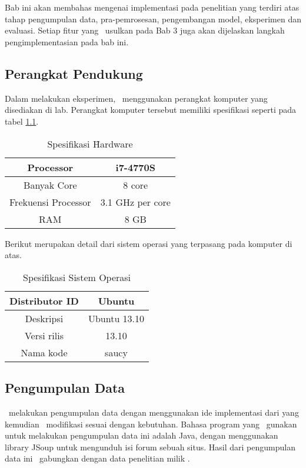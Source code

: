 \chapter{\babEmpat} \label{eksperimen}

Bab ini akan membahas mengenai implementasi pada penelitian yang terdiri atas tahap pengumpulan data, pra-pemrosesan, pengembangan model, eksperimen dan evaluasi. Setiap fitur yang \saya~usulkan pada Bab 3 juga akan dijelaskan langkah pengimplementasian pada bab ini.

\section{Perangkat Pendukung}
Dalam melakukan eksperimen, \saya~menggunakan perangkat komputer yang disediakan di lab. Perangkat komputer tersebut memiliki spesifikasi seperti pada tabel \ref{table:spesifikasi hardware}.

\begin{table}
	\centering
	\caption{Spesifikasi \f{Hardware}}
	\begin{tabular}{|c|c|}
		\hline
		Processor & i7-4770S \\ \hline
		Banyak Core & 8 core \\ \hline
		Frekuensi Processor & 3.1 GHz per core \\ \hline
		RAM & 8 GB \\ \hline
	\end{tabular}
	\label{table:spesifikasi hardware}
\end{table}

Berikut merupakan detail dari sistem operasi yang terpasang pada komputer di atas.
\begin{table}
	\centering
	\caption{Spesifikasi Sistem Operasi}
	\begin{tabular}{|c|c|}
		\hline
		Distributor ID & Ubuntu \\ \hline
		Deskripsi & Ubuntu 13.10 \\ \hline
		Versi rilis & 13.10 \\ \hline
		Nama kode & saucy \\ \hline
	\end{tabular}
	\label{table:spesifikasi os}
\end{table}

\section{Pengumpulan Data}
\Saya~melakukan pengumpulan data dengan menggunakan ide implementasi dari \cite{skripsiKakRadit} yang kemudian \saya~modifikasi sesuai dengan kebutuhan. Bahasa program yang \saya~gunakan untuk melakukan pengumpulan data ini adalah Java, dengan menggunakan library JSoup untuk mengunduh isi forum sebuah situs. Hasil dari pengumpulan data ini \saya~gabungkan dengan data penelitian milik \cite{skripsiKakRadit}.

